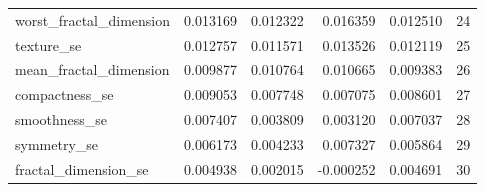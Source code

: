 \begin{tabular}{lrrrrr}
worst_fractal_dimension & 0.013169 & 0.012322 & 0.016359 & 0.012510 & 24 \\
texture_se & 0.012757 & 0.011571 & 0.013526 & 0.012119 & 25 \\
mean_fractal_dimension & 0.009877 & 0.010764 & 0.010665 & 0.009383 & 26 \\
compactness_se & 0.009053 & 0.007748 & 0.007075 & 0.008601 & 27 \\
smoothness_se & 0.007407 & 0.003809 & 0.003120 & 0.007037 & 28 \\
symmetry_se & 0.006173 & 0.004233 & 0.007327 & 0.005864 & 29 \\
fractal_dimension_se & 0.004938 & 0.002015 & -0.000252 & 0.004691 & 30 \\
\bottomrule
\end{tabular}
